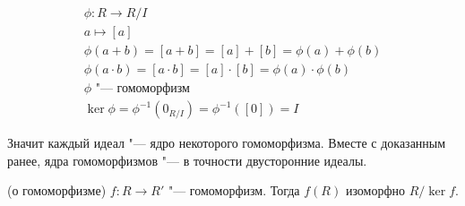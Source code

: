 \begin{gather*}
	\phi \colon R \to R/I \\
	a \mapsto [a] \\
	\phi(a + b) = [a + b] = [a] + [b] = \phi(a) + \phi(b) \\
	\phi(a \cdot b) = [a \cdot b] = [a] \cdot [b] = \phi(a) \cdot \phi(b) \\
	\phi \text{ "--- гомоморфизм} \\
	\ker \phi = \phi^{-1}(0_{R/I}) = \phi^{-1}([0]) = I
\end{gather*}
	
Значит каждый идеал "--- ядро некоторого гомоморфизма.
Вместе с доказанным ранее, ядра гомоморфизмов "--- в точности двусторонние идеалы.
	 
\begin{theorem} (о гомоморфизме)
	$f \colon R \to R'$ "--- гомоморфизм.
	Тогда  $f(R)$ изоморфно $R / \ker f$.	
\end{theorem}

